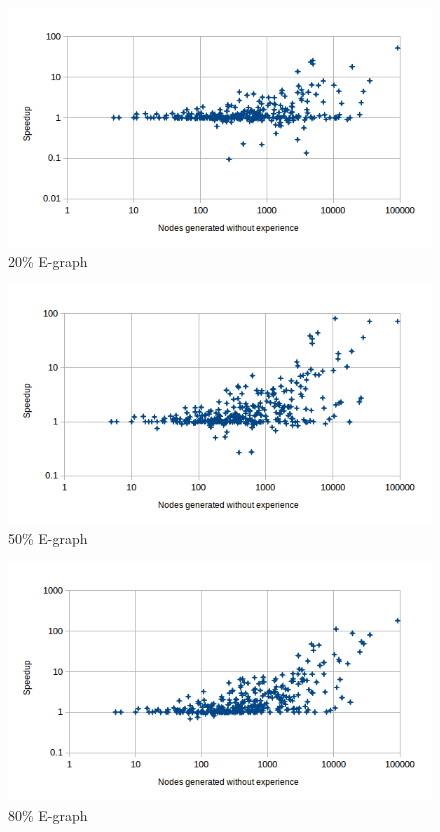 \documentclass[letterpaper]{article}
\begin{document}
\begin{figure}
	\begin{center}
	\includegraphics[scale=0.5]{Speedup_20_0.png}
	\end{center}
	\caption{20\% E-graph}
	 \label{fig:s_20_0}
\end{figure}

\begin{figure}
	\begin{center}
	\includegraphics[scale=0.5]{Speedup_50_0.png}
	\end{center}
	\caption{50\% E-graph}
	 \label{fig:s_50_0}
\end{figure}

\begin{figure}
	\begin{center}
	\includegraphics[scale=0.5]{Speedup_80_0.png}
	\end{center}
	\caption{80\% E-graph}
	 \label{fig:s_80_0}
\end{figure}
\end{document}
